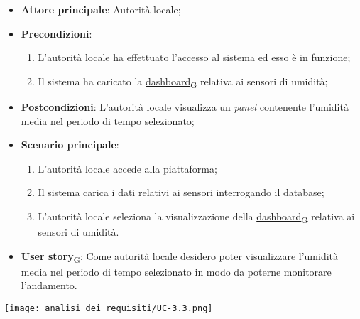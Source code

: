 \begin{itemize}
	\item \textbf{Attore principale}: Autorità locale;
	\item \textbf{Precondizioni}:
	      \begin{enumerate}
		      \item L'autorità locale ha effettuato l'accesso al sistema ed esso è in funzione;
		      \item Il sistema ha caricato la \href{https://7last.github.io/docs/rtb/documentazione-interna/glossario\#dashboard}{dashboard\textsubscript{G}} relativa ai sensori di umidità;
	      \end{enumerate}
	\item \textbf{Postcondizioni}: L'autorità locale visualizza un \textit{panel} contenente l'umidità media nel periodo di tempo selezionato;
	\item \textbf{Scenario principale}:
	      \begin{enumerate}
		      \item L'autorità locale accede alla piattaforma;
		      \item Il sistema carica i dati relativi ai sensori interrogando il database;
		      \item L'autorità locale seleziona la visualizzazione della \href{https://7last.github.io/docs/rtb/documentazione-interna/glossario\#dashboard}{dashboard\textsubscript{G}} relativa ai sensori di umidità.
	      \end{enumerate}
	\item \href{https://7last.github.io/docs/rtb/documentazione-interna/glossario\#user-story}{\textbf{User story}\textsubscript{G}}: Come autorità locale desidero poter visualizzare l'umidità media nel periodo di tempo selezionato
	      in modo da poterne monitorare l'andamento.
\end{itemize}
\begin{center}
	\texttt{[image: analisi\_dei\_requisiti/UC-3.3.png]}
\end{center}


